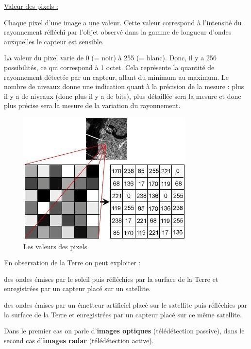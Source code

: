 \documentclass[12pt, openany]{report}
\begin{document}
\par
\underline{Valeur des pixels :}
\par 

Chaque pixel d’une image a une valeur. Cette valeur correspond à l’intensité du rayonnement réfléchi par l’objet observé dans la gamme de longueur d’ondes auxquelles le capteur est sensible. \cite{ref3}

La valeur du pixel varie de 0 (= noir) à 255 (= blanc). Donc, il y a 256 possibilités, ce qui correspond à 1 octet. Cela représente la quantité de rayonnement détectée par un capteur, allant du minimum au maximum. Le nombre de niveaux donne une indication quant à la précision de la mesure : plus il y a de niveaux (donc plus il y a de bits), plus détaillée sera la mesure et donc plus précise sera la mesure de la variation du rayonnement.

\begin{figure}[H]
\centering
\includegraphics[scale=0.75]{pixel_values.png}
\caption{Les valeurs des pixels}
\end{figure}

\par
En observation de la Terre on peut exploiter :
\begin{mylist}
\item
des ondes émises par le soleil puis réfléchies par la surface de la Terre et enregistrées par un capteur placé sur un satellite.
\item
des ondes émises par un émetteur artificiel placé sur le satellite puis réfléchies par la surface de la Terre et enregistrées par un capteur placé sur ce même satellite.
\end{mylist}

Dans le premier cas on parle d'\textbf{images optiques} (télédétection passive), dans le second cas d'\textbf{images radar} (télédétection active).
\end{document}
